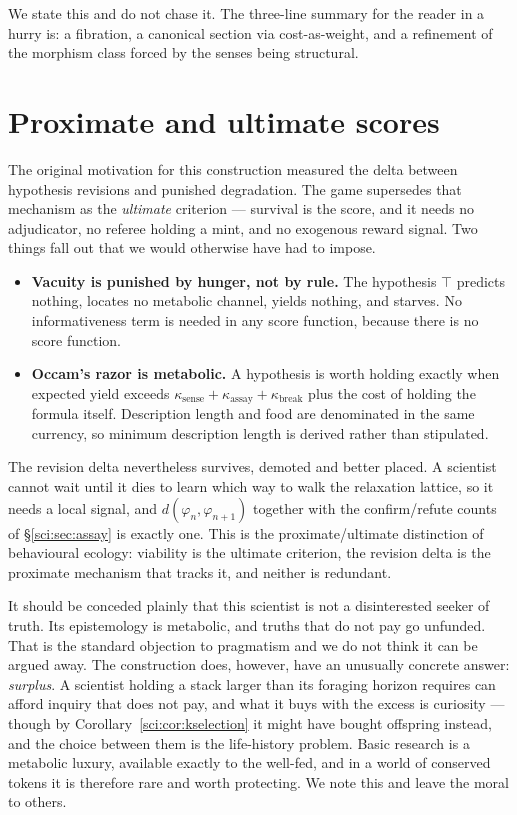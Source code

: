 We state this and do not chase it. The three-line summary for the reader in a hurry is: a fibration, a
canonical section via cost-as-weight, and a refinement of the morphism class forced by the senses being
structural.

\section{Proximate and ultimate scores}\label{sci:S16}
\label{sci:sec:scores}

The original motivation for this construction measured the delta between hypothesis revisions and
punished degradation. The game supersedes that mechanism as the \emph{ultimate} criterion --- survival
is the score, and it needs no adjudicator, no referee holding a mint, and no exogenous reward signal.
Two things fall out that we would otherwise have had to impose.

\begin{itemize}
\item \textbf{Vacuity is punished by hunger, not by rule.} The hypothesis $\top$ predicts nothing,
locates no metabolic channel, yields nothing, and starves. No informativeness term is needed in any
score function, because there is no score function.
\item \textbf{Occam's razor is metabolic.} A hypothesis is worth holding exactly when expected yield
exceeds $\kappa_{\mathrm{sense}} + \kappa_{\mathrm{assay}} + \kappa_{\mathrm{break}}$ plus the cost of
holding the formula itself. Description length and food are denominated in the same currency, so
minimum description length is derived rather than stipulated.
\end{itemize}

The revision delta nevertheless survives, demoted and better placed. A scientist cannot wait until it
dies to learn which way to walk the relaxation lattice, so it needs a local signal, and
$d(\varphi_n, \varphi_{n+1})$ together with the confirm/refute counts of \S\ref{sci:sec:assay} is exactly
one. This is the proximate/ultimate distinction of behavioural ecology: viability is the ultimate
criterion, the revision delta is the proximate mechanism that tracks it, and neither is redundant.

\begin{remark}
\label{sci:rem:pragmatist}
It should be conceded plainly that this scientist is not a disinterested seeker of truth. Its
epistemology is metabolic, and truths that do not pay go unfunded. That is the standard objection to
pragmatism and we do not think it can be argued away. The construction does, however, have an unusually
concrete answer: \emph{surplus}. A scientist holding a stack larger than its foraging horizon requires
can afford inquiry that does not pay, and what it buys with the excess is curiosity --- though by
Corollary~\ref{sci:cor:kselection} it might have bought offspring instead, and the choice between them is
the life-history problem. Basic research is
a metabolic luxury, available exactly to the well-fed, and in a world of conserved tokens it is
therefore rare and worth protecting. We note this and leave the moral to others.
\end{remark}

